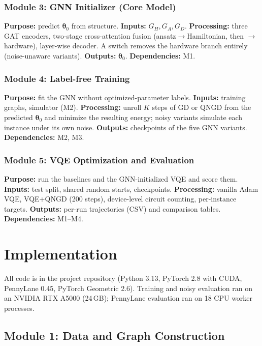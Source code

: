 \documentclass{ssnreview}
\begin{document}
\subsection{Module 3: GNN Initializer (Core Model)}
\textbf{Purpose:} predict $\boldsymbol\theta_0$ from structure. \textbf{Inputs:}
$G_H,G_A,G_D$. \textbf{Processing:} three GAT encoders, two-stage cross-attention fusion
(ansatz$\to$Hamiltonian, then $\to$hardware), layer-wise decoder. A switch removes the hardware
branch entirely (noise-unaware variants). \textbf{Outputs:} $\boldsymbol\theta_0$.
\textbf{Dependencies:} M1.

\subsection{Module 4: Label-free Training}
\textbf{Purpose:} fit the GNN without optimized-parameter labels. \textbf{Inputs:} training
graphs, simulator (M2). \textbf{Processing:} unroll $K$ steps of GD or QNGD from the predicted
$\boldsymbol\theta_0$ and minimize the resulting energy; noisy variants simulate each instance
under its own noise. \textbf{Outputs:} checkpoints of the five GNN variants.
\textbf{Dependencies:} M2, M3.

\subsection{Module 5: VQE Optimization and Evaluation}
\textbf{Purpose:} run the baselines and the GNN-initialized VQE and score them.
\textbf{Inputs:} test split, shared random starts, checkpoints. \textbf{Processing:} vanilla
Adam VQE, VQE+QNGD (200 steps), device-level circuit counting, per-instance targets.
\textbf{Outputs:} per-run trajectories (CSV) and comparison tables. \textbf{Dependencies:}
M1--M4.

\chapter{Implementation}

All code is in the project repository (Python 3.13, PyTorch 2.8 with CUDA, PennyLane 0.45,
PyTorch Geometric 2.6). Training and noisy evaluation ran on an NVIDIA RTX A5000 (24\,GB);
PennyLane evaluation ran on 18 CPU worker processes.

\section{Module 1: Data and Graph Construction}\label{sec:m1}
\end{document}

